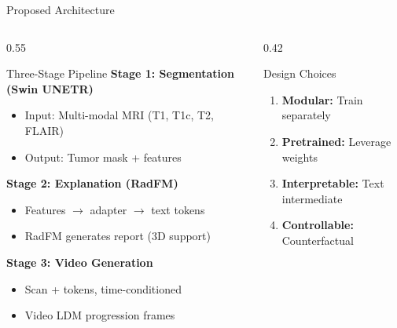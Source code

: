 \documentclass[aspectratio=169,xcolor=dvipsnames]{beamer}
\begin{document}
\begin{frame}{Proposed Architecture}
    \begin{columns}
        \begin{column}{0.55\textwidth}
            \begin{block}{Three-Stage Pipeline}
                \small
                \textbf{Stage 1: Segmentation (Swin UNETR)}
                \begin{itemize}\setlength{\itemsep}{0pt}
                    \item Input: Multi-modal MRI (T1, T1c, T2, FLAIR)
                    \item Output: Tumor mask + features
                \end{itemize}
                
                \textbf{Stage 2: Explanation (RadFM)}
                \begin{itemize}\setlength{\itemsep}{0pt}
                    \item Features $\to$ adapter $\to$ text tokens
                    \item RadFM generates report (3D support)
                \end{itemize}
                
                \textbf{Stage 3: Video Generation}
                \begin{itemize}\setlength{\itemsep}{0pt}
                    \item Scan + tokens, time-conditioned
                    \item Video LDM progression frames
                \end{itemize}
            \end{block}
        \end{column}
        
        \begin{column}{0.42\textwidth}
            \begin{block}{Design Choices}
                \small
                \begin{enumerate}\setlength{\itemsep}{2pt}
                    \item \textbf{Modular:} Train separately
                    \item \textbf{Pretrained:} Leverage weights
                    \item \textbf{Interpretable:} Text intermediate
                    \item \textbf{Controllable:} Counterfactual
                \end{enumerate}
            \end{block}
            

\end{column}
\end{columns}
\end{frame}
\end{document}
